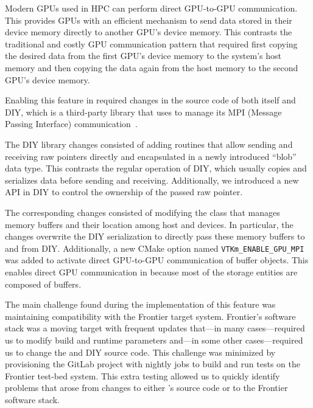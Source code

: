 Modern GPUs used in HPC can perform direct GPU-to-GPU communication. This provides GPUs with an efficient mechanism to send data stored in their device memory directly to another GPU's device memory. This contrasts the traditional and costly GPU communication pattern that required first copying the desired data from the first GPU's device memory to the system's host memory and then copying the data again from the host memory to the second GPU's device memory.

Enabling this feature in \vtkm required changes in the source code of both \vtkm itself and DIY, which is a third-party library that \vtkm uses to manage its MPI (Message Passing Interface) communication~\citep{Peterka2011,Morozov2016}.

The DIY library changes consisted of adding routines that allow sending and receiving raw pointers directly and encapsulated in a newly introduced ``blob'' data type. This contrasts the regular operation of DIY, which usually copies and serializes data before sending and receiving. Additionally, we introduced a new API in DIY to control the ownership of the passed raw pointer.

The corresponding \vtkm changes consisted of modifying the \vtkm class that manages memory buffers and their location among host and devices.
In particular, the changes overwrite the DIY serialization to directly pass these memory buffers to and from DIY.
Additionally, a new CMake option named \texttt{VTKm\_ENABLE\_GPU\_MPI} was added to activate direct GPU-to-GPU communication of \vtkm buffer objects.
This enables direct GPU communication in \vtkm because most of the \vtkm storage entities are composed of \vtkm buffers. 

The main challenge found during the implementation of this feature was maintaining compatibility with the Frontier target system.
Frontier's software stack was a moving target with frequent updates that---in many cases---required us to modify build and runtime parameters and---in some other cases---required us to change the \vtkm and DIY source code.
This challenge was minimized by provisioning the \vtkm GitLab project with nightly jobs to build and run tests on the Frontier test-bed system.
This extra testing allowed us to quickly identify problems that arose from changes to either \vtkm's source code or to the Frontier software stack.
